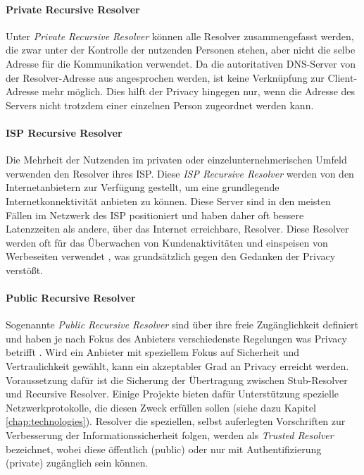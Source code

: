 \paragraph{Private Recursive Resolver}
Unter \textit{Private Recursive Resolver} können alle Resolver zusammengefasst werden, die zwar unter der Kontrolle der nutzenden Personen stehen, aber nicht die selbe Adresse für die Kommunikation verwendet. Da die autoritativen DNS-Server von der Resolver-Adresse aus angesprochen werden, ist keine Verknüpfung zur Client-Adresse mehr möglich. Dies hilft der Privacy hingegen nur, wenn die Adresse des Servers nicht trotzdem einer einzelnen Person zugeordnet werden kann.

\paragraph{ISP Recursive Resolver}
Die Mehrheit der Nutzenden im privaten oder einzelunternehmerischen Umfeld verwenden den Resolver ihres \ac{ISP}. Diese \textit{ISP Recursive Resolver} werden von den Internetanbietern zur Verfügung gestellt, um eine grundlegende Internetkonnektivität anbieten zu können. Diese Server sind in den meisten Fällen im Netzwerk des ISP positioniert und haben daher oft bessere Latenzzeiten als andere, über das Internet erreichbare, Resolver. Diese Resolver werden oft für das Überwachen von Kundenaktivitäten und einspeisen von Werbeseiten verwendet \cite{Weaver2011}, was grundsätzlich gegen den Gedanken der Privacy verstößt.

\paragraph{Public Recursive Resolver}
Sogenannte \textit{Public Recursive Resolver} sind über ihre freie Zugänglichkeit definiert und haben je nach Fokus des Anbieters verschiedenste Regelungen was Privacy betrifft \cite{Prince2018}\cite{Quad92018}. Wird ein Anbieter mit speziellem Fokus auf Sicherheit und Vertraulichkeit gewählt, kann ein akzeptabler Grad an Privacy erreicht werden. Voraussetzung dafür ist die Sicherung der Übertragung zwischen Stub-Resolver und Recursive Resolver. Einige Projekte bieten dafür Unterstützung spezielle Netzwerkprotokolle, die diesen Zweck erfüllen sollen (siehe dazu Kapitel \ref{chap:technologies}). Resolver die speziellen, selbst auferlegten Vorschriften zur Verbesserung der Informationssicherheit folgen, werden als \textit{Trusted Resolver} bezeichnet, wobei diese öffentlich (public) oder nur mit Authentifizierung (private) zugänglich sein können.

